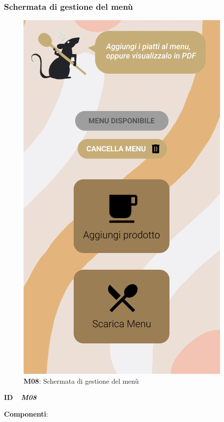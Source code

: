         \subsubsection{Schermata di gestione del menù}
        \begin{figure}[H]
            \centering
            \includegraphics[scale=0.35]{assets/diagrammi/Mockup/Mockup_MenuManager.png}
            \caption{\textbf{M08}: Schermata di gestione del menù}\label{fig:Mockup_MenuManager}
        \end{figure}
        \begin{flushleft}
            \textbf{ID} \ \Large{ \emph{\textbf{M08}}}
        \end{flushleft}
        \textbf{Componenti}:

